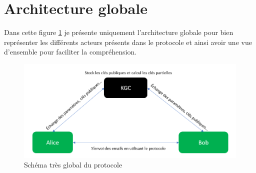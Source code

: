 \section{Architecture globale}
Dans cette figure \ref{fig:globalProtocol} je présente uniquement l'architecture globale pour bien représenter les différents acteurs présents dans le protocole et ainsi avoir une vue d'ensemble pour faciliter la compréhension.
\begin{figure}[h!]
	\centering
	\includegraphics[width=14cm]{images/SchemaGlobal.png}
	\caption{Schéma très global du protocole}
	\label{fig:globalProtocol}
\end{figure}
